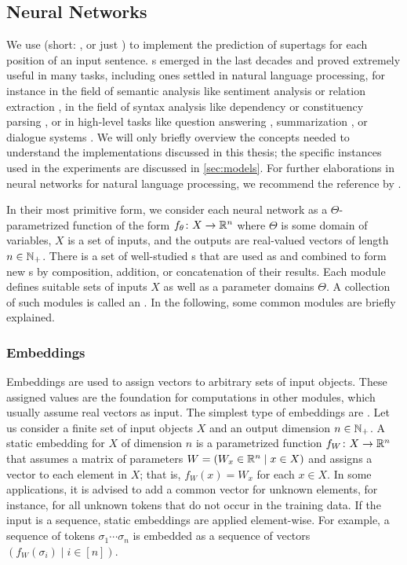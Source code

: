 \documentclass[../document.tex]{subfiles}
\begin{document}
    \subsection{Neural Networks}\label{sec:preliminaries:nn}
    We use  (short: , or just ) to implement the prediction of supertags for each position of an input sentence.
    s emerged in the last decades and proved extremely useful in many tasks, including ones settled in natural language processing, for instance in the field of semantic analysis like sentiment analysis \citep{sentiment} or relation extraction \citep{relationextraction}, in the field of syntax analysis like dependency \citep{dependencyparsing} or constituency parsing \citep{FerGom20a}, or in high-level tasks like question answering \citep{Devlin2019}, summarization \citep{bertgeneration}, or dialogue systems \citep{dialoguesystems}.
    We will only briefly overview the concepts needed to understand the implementations discussed in this thesis; the specific instances used in the experiments are discussed in \cref{sec:models}.
    For further elaborations in neural networks for natural language processing, we recommend the reference by \citet{Gol22}.

    In their most primitive form, we consider each neural network as a \(\varTheta\)-parametrized function of the form \(f_\theta\colon X \to \mathbb{R}^n\) where \(\varTheta\) is some domain of variables, \(X\) is a set of inputs, and the outputs are real-valued vectors of length \(n \in \mathbb{N}_+\).
    There is a set of well-studied s that are used as  and combined to form new s by composition, addition, or concatenation of their results.
    Each module defines suitable sets of inputs \(X\) as well as a parameter domains \(\varTheta\). 
    A collection of such modules is called an .
    In the following, some common modules are briefly explained.

    \subsubsection{Embeddings}
    Embeddings are used to assign vectors to arbitrary sets of input objects.
    These assigned values are the foundation for computations in other modules, which usually assume real vectors as input.
    The simplest type of embeddings are .
    Let us consider a finite set of input objects \(X\) and an output dimension \(n \in \mathbb{N}_+\).
    A static embedding for \(X\) of dimension \(n\) is a parametrized function \(f_W\colon X \to \mathbb{R}^n\) that assumes a matrix of parameters \(W = (W_x \in \mathbb{R}^n \mid x \in X)\) and assigns a vector to each element in \(X\); that is, \(f_W(x) = W_{x}\) for each \(x \in X\).
    In some applications, it is advised to add a common vector for unknown elements, for instance, for all unknown tokens that do not occur in the training data.
    If the input is a sequence, static embeddings are applied element-wise.
    For example, a sequence of tokens \(\sigma_1 \cdots \sigma_n\) is embedded as a sequence of vectors \((f_W(\sigma_i) \mid i \in [n])\).
\end{document}
